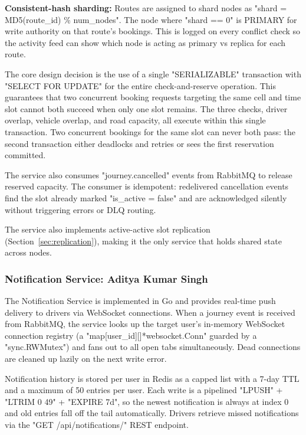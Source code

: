 \documentclass[11pt,a4paper]{article}
\begin{document}
\textbf{Consistent-hash sharding:} Routes are assigned to shard nodes as "shard = MD5(route\_id) \% num\_nodes". The node where "shard == 0" is PRIMARY for write authority on that route's bookings. This is logged on every conflict check so the activity feed can show which node is acting as primary vs replica for each route.
 
The core design decision is the use of a single "SERIALIZABLE" transaction with "SELECT FOR UPDATE" for the entire check-and-reserve operation. This guarantees that two concurrent booking requests targeting the same cell and time slot cannot both succeed when only one slot remains. The three checks, driver overlap, vehicle overlap, and road capacity, all execute within this single transaction. Two concurrent bookings for the same slot can never both pass: the second transaction either deadlocks and retries or sees the first reservation committed.
 
The service also consumes "journey.cancelled" events from RabbitMQ to release reserved capacity. The consumer is idempotent: redelivered cancellation events find the slot already marked "is\_active = false" and are acknowledged silently without triggering errors or DLQ routing.

The service also implements active-active slot replication (Section~\ref{sec:replication}), making it the only service that holds shared state across nodes.
 
\subsubsection{Notification Service: Aditya Kumar Singh}
 
The Notification Service is implemented in Go and provides real-time push delivery to drivers via WebSocket connections. When a journey event is received from RabbitMQ, the service looks up the target user's in-memory WebSocket connection registry (a "map[user\_id][]*websocket.Conn" guarded by a "sync.RWMutex") and fans out to all open tabs simultaneously. Dead connections are cleaned up lazily on the next write error.

Notification history is stored per user in Redis as a capped list with a 7-day TTL and a maximum of 50 entries per user. Each write is a pipelined "LPUSH" + "LTRIM 0 49" + "EXPIRE 7d", so the newest notification is always at index 0 and old entries fall off the tail automatically. Drivers retrieve missed notifications via the "GET /api/notifications/" REST endpoint.
\end{document}
